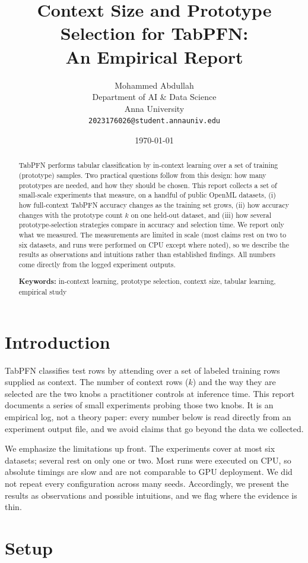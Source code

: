 \documentclass[11pt,a4paper]{article}
\title{Context Size and Prototype Selection for TabPFN:\\ An Empirical Report}
\author{
Mohammed Abdullah\\
Department of AI \& Data Science\\
Anna University\\
\texttt{2023176026@student.annauniv.edu}
}
\date{\today}
\begin{document}
\maketitle

\begin{abstract}
TabPFN performs tabular classification by in-context learning over a set of
training (prototype) samples. Two practical questions follow from this design:
how many prototypes are needed, and how they should be chosen. This report
collects a set of small-scale experiments that measure, on a handful of public
OpenML datasets, (i) how full-context TabPFN accuracy changes as the training
set grows, (ii) how accuracy changes with the prototype count $k$ on one
held-out dataset, and (iii) how several prototype-selection strategies compare
in accuracy and selection time. We report only what we measured. The
measurements are limited in scale (most claims rest on two to six datasets, and
runs were performed on CPU except where noted), so we describe the results as
observations and intuitions rather than established findings. All numbers come
directly from the logged experiment outputs.

\textbf{Keywords:} in-context learning, prototype selection, context size,
tabular learning, empirical study
\end{abstract}

\section{Introduction}

TabPFN classifies test rows by attending over a set of labeled training rows
supplied as context. The number of context rows ($k$) and the way they are
selected are the two knobs a practitioner controls at inference time. This
report documents a series of small experiments probing those two knobs. It is
an empirical log, not a theory paper: every number below is read directly from
an experiment output file, and we avoid claims that go beyond the data we
collected.

We emphasize the limitations up front. The experiments cover at most six
datasets; several rest on only one or two. Most runs were executed on CPU, so
absolute timings are slow and are not comparable to GPU deployment. We did not
repeat every configuration across many seeds. Accordingly, we present the
results as observations and possible intuitions, and we flag where the evidence
is thin.

\section{Setup}
\end{document}
